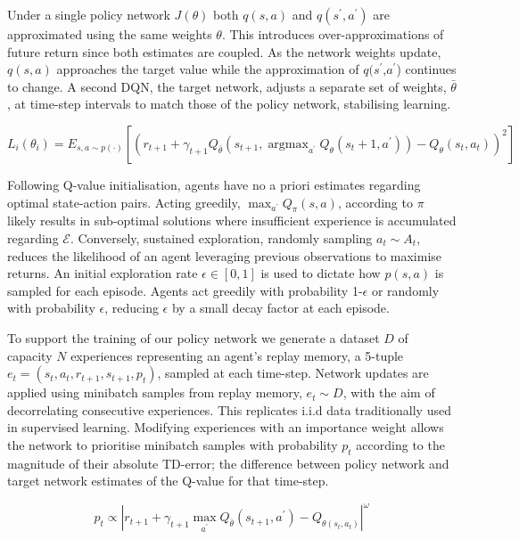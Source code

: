 \documentclass[runningheads]{llncs}
\DeclareMathOperator*{\argmax}{argmax}
\begin{document}
Under a single policy network $J(\theta)$ both $q(s,a)$ and $q(s^{\prime},a^{\prime})$ are approximated using the same weights $\theta$.  This introduces over-approximations of future return since both estimates are coupled. As the network weights update, $q(s,a)$ approaches the target value while the approximation of $q(s^{\prime}$,$a^{\prime}$) continues to change. A second DQN, the target network, adjusts a separate set of weights, $\bar{\theta}$, at time-step intervals to match those of the policy network, stabilising learning.

\begin{equation}
	L_i(\theta_i) = E_{s,a\sim p(\cdot)} \left[(r_{t+1} + \gamma_{t+1}Q_{\bar{\theta}}(s_{t+1}, \argmax_{a^\prime} Q_{\theta}(s_t+1, a^\prime)) - Q_{\theta}(s_t, a_t))^{2} \right] 
\end{equation}

Following Q-value initialisation, agents have no a priori estimates regarding optimal state-action pairs. Acting greedily, $\max_{a^{\prime}} Q_\pi(s,a)$,  according to $\pi$ likely results in sub-optimal solutions where insufficient experience is accumulated regarding $\mathcal{E}$. Conversely, sustained exploration, randomly sampling $a_t \sim A_t$, reduces the likelihood of an agent leveraging previous observations to maximise returns. An initial exploration rate $\epsilon \in [0,1]$ is used to dictate how $p(s,a)$ is sampled for each episode. Agents act greedily with probability 1-$\epsilon$ or randomly with probability $\epsilon$, reducing $\epsilon$ by a small decay factor at each episode.

To support the training of our policy network we generate a dataset $D$ of capacity $N$ experiences representing an agent's replay memory, a 5-tuple \begin{math}
	e_{t} = (s_t,a_t,r_{t+1},s_{t+1}, p_t)
\end{math}, sampled at each time-step. Network updates are applied using minibatch samples from replay memory, $e_t \sim D$, with the aim of decorrelating consecutive experiences. This replicates i.i.d data traditionally used in supervised learning. Modifying experiences with an importance weight allows the network to prioritise minibatch samples with probability $p_t$ according to the magnitude of their absolute TD-error; the difference between policy network and target network estimates of the Q-value for that time-step.

\begin{equation}
	p_t \propto \left| r_{t+1} + \gamma_{t+1} \max_{a^\prime} Q_{\bar\theta}(s_{t+1}, a^\prime) - Q_{\theta(s_t, a_t)} \right|^\omega
\end{equation}
\end{document}
